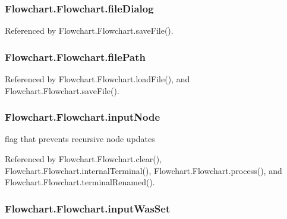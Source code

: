\subsubsection[{file\+Dialog}]{\setlength{\rightskip}{0pt plus 5cm}Flowchart.\+Flowchart.\+file\+Dialog}\label{classFlowchart_1_1Flowchart_ad625b9fafa1f2a2ba0914b8b00fc0750}


Referenced by Flowchart.\+Flowchart.\+save\+File().

\hypertarget{classFlowchart_1_1Flowchart_ad3ef7026c868ea6f6b29d9431b28a4b9}{}
\subsubsection[{file\+Path}]{\setlength{\rightskip}{0pt plus 5cm}Flowchart.\+Flowchart.\+file\+Path}\label{classFlowchart_1_1Flowchart_ad3ef7026c868ea6f6b29d9431b28a4b9}


Referenced by Flowchart.\+Flowchart.\+load\+File(), and Flowchart.\+Flowchart.\+save\+File().

\hypertarget{classFlowchart_1_1Flowchart_a84ef6d80eda5bb411ed8fc42d498abf8}{}
\subsubsection[{input\+Node}]{\setlength{\rightskip}{0pt plus 5cm}Flowchart.\+Flowchart.\+input\+Node}\label{classFlowchart_1_1Flowchart_a84ef6d80eda5bb411ed8fc42d498abf8}


flag that prevents recursive node updates 



Referenced by Flowchart.\+Flowchart.\+clear(), Flowchart.\+Flowchart.\+internal\+Terminal(), Flowchart.\+Flowchart.\+process(), and Flowchart.\+Flowchart.\+terminal\+Renamed().

\hypertarget{classFlowchart_1_1Flowchart_a3174a7d3c4a0a4c1d599c2b870e4aa49}{}
\subsubsection[{input\+Was\+Set}]{\setlength{\rightskip}{0pt plus 5cm}Flowchart.\+Flowchart.\+input\+Was\+Set}\label{classFlowchart_1_1Flowchart_a3174a7d3c4a0a4c1d599c2b870e4aa49}


